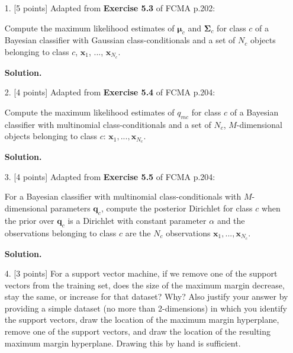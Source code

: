 \documentclass[10pt]{article}
\begin{document}
\newpage
\begin{itemize}

\item[1.]  [5 points]  %
Adapted from {\bf Exercise 5.3} of FCMA p.202:

Compute the maximum likelihood estimates of $\boldsymbol{\mu}_c$ and $\boldsymbol{\Sigma}_c$ for class $c$ of a Bayesian classifier with Gaussian class-conditionals and a set of $N_c$ objects belonging to class $c$, $\mathbf{x}_1$, ..., $\mathbf{x}_{N_c}$. 

{\bf Solution.} %




\item[2.]  [4 points]
Adapted from {\bf Exercise 5.4} of FCMA p.204:

Compute the maximum likelihood estimates of $q_{mc}$ for class $c$ of a Bayesian classifier with multinomial class-conditionals and a set of $N_c$, $M$-dimensional objects belonging to class $c$: $\mathbf{x}_1, ..., \mathbf{x}_{N_c}$.

{\bf Solution.} %




\item[3.]  [4 points]  
Adapted from {\bf Exercise 5.5} of FCMA p.204:

For a Bayesian classifier with multinomial class-conditionals with $M$-dimensional parameters $\mathbf{q}_c$, compute the posterior Dirichlet for class $c$ when the prior over $\mathbf{q}_c$ is a Dirichlet with constant parameter $\alpha$ and the observations belonging to class $c$ are the $N_c$ observations $\mathbf{x}_1, ..., \mathbf{x}_{N_c}$.

{\bf Solution.} %







\item[4.]  [3 points]
For a support vector machine, if we remove one of the support vectors from the training set, does the size of the maximum margin decrease, stay the same, or increase for that dataset?  Why?  Also justify your answer by providing a simple dataset (no more than 2-dimensions) in which you identify the support vectors, draw the location of the maximum margin hyperplane, remove one of the support vectors, and draw the location of the resulting maximum margin hyperplane.  Drawing this by hand is sufficient.


\end{itemize}
\end{document}
